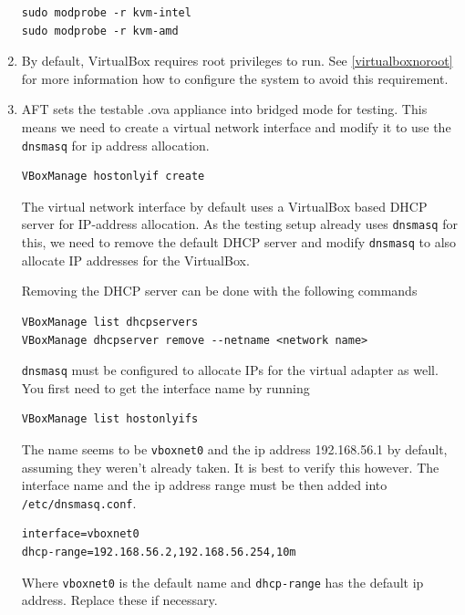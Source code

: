 \documentclass[a4paper,11pt]{article}
\newcommand{\cmd}[1]{\texttt{#1}}
\begin{document}
\begin{enumerate}
\begin{lstlisting}
sudo modprobe -r kvm-intel
sudo modprobe -r kvm-amd 
\end{lstlisting}

\item 
By default, VirtualBox requires root privileges to run. See \ref{virtualboxnoroot} for more information how to configure the system to avoid this requirement.

\item
AFT sets the testable .ova appliance into bridged mode for testing. This means we need to create a virtual network interface and modify it to use the \cmd{dnsmasq} for ip address allocation.

\begin{lstlisting}
VBoxManage hostonlyif create
\end{lstlisting}

The virtual network interface by default uses a VirtualBox based DHCP server for IP-address allocation. As the testing setup already uses \cmd{dnsmasq} for this, we need to remove the default DHCP server and modify \cmd{dnsmasq} to also allocate IP addresses for the VirtualBox.

Removing the DHCP server can be done with the following commands

\begin{lstlisting}
VBoxManage list dhcpservers
VBoxManage dhcpserver remove --netname <network name>
\end{lstlisting}

\cmd{dnsmasq} must be configured to allocate IPs for the virtual adapter as well. You first need to get the interface name by running

\begin{lstlisting}
VBoxManage list hostonlyifs
\end{lstlisting}

The name seems to be \cmd{vboxnet0} and the ip address 192.168.56.1 by default, assuming they weren't already taken. It is best to verify this however. The interface name and the ip address range must be then added into \cmd{/etc/dnsmasq.conf}. 

\begin{lstlisting}
interface=vboxnet0
dhcp-range=192.168.56.2,192.168.56.254,10m
\end{lstlisting}

Where \cmd{vboxnet0} is the default name and \cmd{dhcp-range} has the default ip address. Replace these if necessary.


\end{enumerate}
\end{document}
